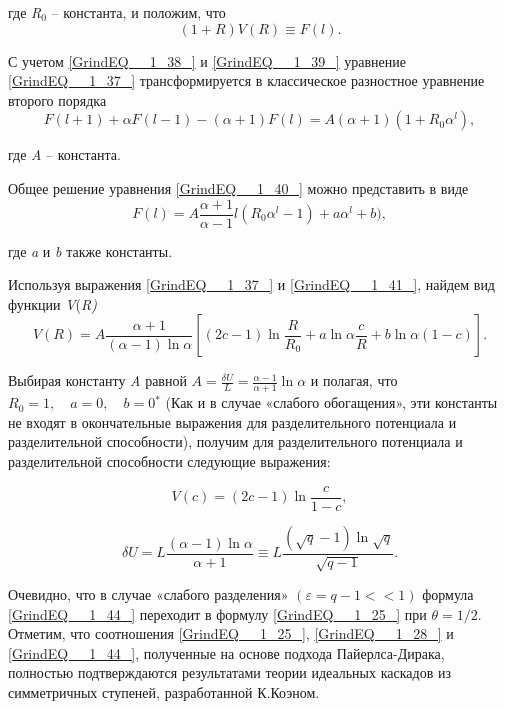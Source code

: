 где \textit{R}${}_{0}$ -- константа, и положим, что
\begin{equation} \label{GrindEQ__1_39_} 
(1+R)V(R)\equiv F(l).     
\end{equation} 

С учетом \ref{GrindEQ__1_38_} и \ref{GrindEQ__1_39_} уравнение \ref{GrindEQ__1_37_} трансформируется в классическое разностное уравнение второго порядка
\begin{equation} \label{GrindEQ__1_40_} 
F(l+1)+\alpha F(l-1)-(\alpha +1)F(l)=A(\alpha +1)(1+R_{0} \alpha ^{l} ),   
\end{equation} 

где \textit{A} -- константа.

Общее решение уравнения \ref{GrindEQ__1_40_} можно представить в виде
\begin{equation} \label{GrindEQ__1_41_} 
F(l)=A\frac{\alpha +1}{\alpha -1} l(R_{0} \alpha ^{l} -1)+a\alpha ^{l} +b),    
\end{equation} 

где \textit{a }и \textit{b} также константы.

Используя выражения \ref{GrindEQ__1_37_} и \ref{GrindEQ__1_41_}, найдем вид функции \textit{V}(\textit{R)}
\begin{equation} \label{GrindEQ__1_42_} 
V(R)=A\frac{\alpha +1}{(\alpha -1)\ln \alpha } \left[(2c-1)\ln \frac{R}{R_{0} } +a\ln \alpha \frac{c}{R} +b\ln \alpha (1-c)\right].  
\end{equation} 

Выбирая константу \textit{A} равной $A=\frac{\delta U}{L} =\frac{\alpha -1}{\alpha +1} \ln \alpha $ и полагая, что $R_{0} =1,\quad a=0,\quad b=0$${}^{*}$ (Как и в случае «слабого обогащения», эти константы не входят в окончательные выражения для разделительного потенциала и разделительной способности), получим для разделительного потенциала и разделительной способности следующие выражения:

\begin{equation} \label{GrindEQ__1_43_} 
V(c)=(2c-1)\ln \frac{c}{1-c} ,        
\end{equation} 

\begin{equation} \label{GrindEQ__1_44_} 
\delta U=L\frac{(\alpha -1)\ln \alpha }{\alpha +1} \equiv L\frac{\left(\sqrt{q} -1\right)\ln \sqrt{q} }{\sqrt{q-1} } .     
\end{equation} 

Очевидно, что в случае «слабого разделения» $(\varepsilon =q-1<<1)$ формула \ref{GrindEQ__1_44_} переходит в формулу \ref{GrindEQ__1_25_} при $\theta =1/2$. Отметим, что соотношения \ref{GrindEQ__1_25_}, \ref{GrindEQ__1_28_} и \ref{GrindEQ__1_44_}, полученные на основе подхода Пайерлса-Дирака, полностью подтверждаются результатами теории идеальных каскадов из симметричных ступеней, разработанной К.Коэном.

